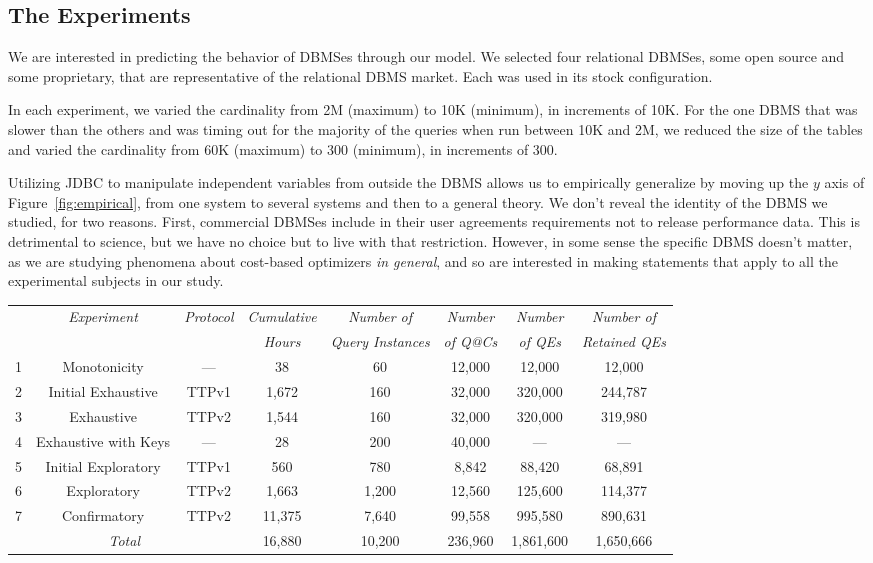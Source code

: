 \documentclass[prodmode,acmtods]{acmsmall}
\begin{document}
\subsection{The Experiments}\label{sec:experiments}

We are interested in predicting the behavior of \hbox{DBMSes} through our
model. We selected four relational
\hbox{DBMSes}, some open source and some proprietary, that are representative of
the relational \hbox{DBMS} market. Each was used in its stock configuration.

In each experiment, we varied the
cardinality from 2M (maximum) to 10K (minimum), in increments of 10K. For
the one \hbox{DBMS} that was slower than the others and was timing out for
the majority of the queries when run between 10K and 2M, we reduced the
size of the tables and varied the cardinality from 60K (maximum) to 300 
(minimum), in increments of 300.

Utilizing JDBC to manipulate independent variables from outside the
  \hbox{DBMS} allows us to empirically generalize by moving up the $y$ axis of
  Figure~\ref{fig:empirical}, from one system to several systems and then to
  a general theory. We don't reveal the identity of the \hbox{DBMS} we studied, for two reasons. First, commercial \hbox{DBMSes}
include in their user agreements requirements not to release 
performance data. This is detrimental to science, but we have no choice but
to live with that restriction. However, in some sense the specific \hbox{DBMS}
doesn't matter, as we are studying phenomena about cost-based optimizers
{\em in general}, and so are interested in making statements that apply to
all the experimental subjects in our study.

\begin{table}[t]
{%
\resizebox{140mm}{!}
{
\begin{tabular}{c|c|c|c|c|c|c|c}
& {\em Experiment}& {\em Protocol} & {\em Cumulative} & {\em Number of}&{\em
    Number} &{\em Number}& {\em Number of}\\
& & & {\em Hours} & {\em Query Instances}&{\em of Q@Cs} &{\em of QEs}&{\em Retained QEs}\\
\hline
1 & Monotonicity 		& --- & 38 & 60 & 12,000 & 12,000 & 12,000\\
2 & Initial Exhaustive 		& TTPv1 & 1,672 & 160 & 32,000 & 320,000 & 244,787\\
3 & Exhaustive 			& TTPv2 & 1,544 & 160 & 32,000 & 320,000 & 319,980\\
4 & Exhaustive with Keys 	& --- & 28 & 200 & 40,000 & --- & ---\\
5 & Initial Exploratory 	& TTPv1 & 560 & 780 & 8,842 & 88,420 & 68,891\\%
6 & Exploratory 		& TTPv2 & 1,663 & 1,200 & 12,560 & 125,600 & 114,377\\
7 & Confirmatory 		& TTPv2 & 11,375 & 7,640 & 99,558 & 995,580 & 890,631\\
\multicolumn{3}{c|}{\em Total}	& 16,880 & 10,200 & 236,960 & 1,861,600 & 1,650,666\\
\end{tabular}
}
}
\end{table}
\end{document}
